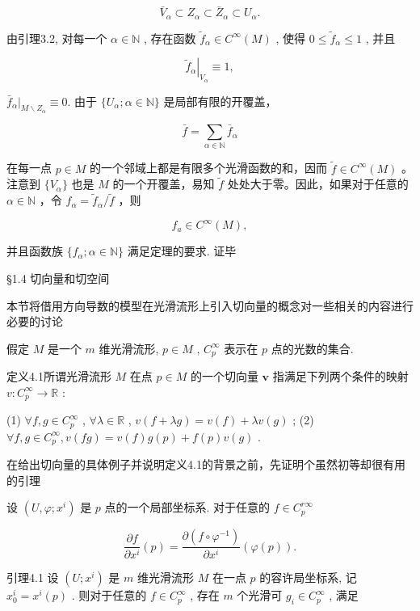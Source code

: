 $$
\bar {V} _ {\alpha} \subset Z _ {\alpha} \subset \bar {Z} _ {\alpha} \subset U _ {\alpha}.
$$

由引理3.2, 对每一个  $\alpha \in \mathbb{N}$ , 存在函数  $\tilde{f}_{\alpha} \in C^{\infty}(M)$ , 使得  $0 \leqslant \tilde{f}_{\alpha} \leqslant 1$ , 并且

$$
\left. \tilde {f} _ {\alpha} \right| _ {V _ {\alpha}} \equiv 1,
$$

$\bar{f}_{\alpha}\bigg|_{M\backslash Z_{\alpha}}\equiv 0.$  由于  $\{U_{\alpha};\alpha \in \mathbb{N}\}$  是局部有限的开覆盖，

$$
\bar {f} = \sum_ {\alpha \in \mathbb {N}} \bar {f} _ {\alpha}
$$

在每一点  $p \in M$  的一个邻域上都是有限多个光滑函数的和，因而  $\tilde{f} \in C^{\infty}(M)$ 。注意到  $\{V_{\alpha}\}$  也是  $M$  的一个开覆盖，易知  $\tilde{f}$  处处大于零。因此，如果对于任意的  $\alpha \in \mathbb{N}$ ，令  $f_{\alpha} = \tilde{f}_{\alpha} / \tilde{f}$ ，则

$$
f _ {a} \in C ^ {\infty} (M),
$$

并且函数族  $\{f_{\alpha}; \alpha \in \mathbb{N}\}$  满足定理的要求. 证毕

 §1.4 切向量和切空间

本节将借用方向导数的模型在光滑流形上引入切向量的概念对一些相关的内容进行必要的讨论

假定  $M$  是一个  $m$  维光滑流形,  $p \in M$ ,  $C_{p}^{\infty}$  表示在  $p$  点的光数的集合.

定义4.1所谓光滑流形  $M$  在点  $p \in M$  的一个切向量  $\pmb{v}$  指满足下列两个条件的映射  $v: C_{\overline{p}}^{\infty} \to \mathbb{R}$ :

(1)  $\forall f, g \in C_p^\infty$ ,  $\forall \lambda \in \mathbb{R}$ ,  $v(f + \lambda g) = v(f) + \lambda v(g)$ ;  
(2)  $\forall f, g \in C_{p}^{\infty}, v(fg) = v(f)g(p) + f(p)v(g)$ .

在给出切向量的具体例子并说明定义4.1的背景之前，先证明个虽然初等却很有用的引理

设  $(U, \varphi; x^i)$  是  $p$  点的一个局部坐标系. 对于任意的  $f \in C_p^{r\infty}$

$$
\frac {\partial f}{\partial x ^ {i}} (p) = \frac {\partial (f \circ \varphi^ {- 1})}{\partial x ^ {i}} (\varphi (p)).
$$

引理4.1 设  $(U; x^i)$  是  $m$  维光滑流形  $M$  在一点  $p$  的容许局坐标系, 记  $x_0^i = x^i(p)$ . 则对于任意的  $f \in C_p^\infty$ , 存在  $m$  个光滑可  $g_i \in C_p^\infty$ , 满足

